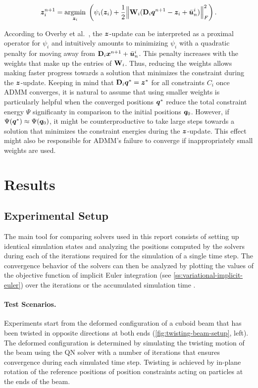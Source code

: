 \begin{equation}\label{eq:admm-z-update-copy}
    \bm{z}_i^{n+1} = \underset{\bm{z}_i}{\operatorname{argmin}}\; \left (\psi_i(\bm{z}_i) + \frac{1}{2}\norm{\mathbf{W}_i(\mathbf{D}_i\bm{q}^{n+1} - \bm{z}_i + \bar{\bm{u}}^i_n)}^2_F \right ).
\end{equation}

\noindent According to Overby et al.\ \cite{overby2017}, the $\bm{z}$-update can be interpreted as a proximal operator for $\psi_i$ and intuitively amounts to 
minimizing $\psi_i$ with a quadratic penalty for moving away from $\mathbf{D}_i\bm{x}^{n+1}+ \bar{\bm{u}}^i_n$. This penalty increases with the weights that make 
up the entries of $\mathbf{W}_i$. Thus, reducing the weights allows making faster progress towards a solution that minimizes the constraint during 
the $\bm{z}$-update. Keeping in mind that $\mathbf{D}_i\bm{q}^* = \bm{z}^*$ for all constraints $C_i$ once ADMM converges, it is natural to assume that using smaller
weights is particularly helpful when the converged positions $\bm{q}^*$ reduce the total constraint energy $\Psi$ significanty in comparison to the initial positions 
$\bm{q}_0$. However, if $\Psi(\bm{q}^*) \approx \Psi(\bm{q}_0)$, it might be counterproductive to take large steps towards a solution that minimizes the constraint 
energies during the $\bm{z}$-update. This effect might also be responsible for ADMM's failure to converge if inappropriately small weights are used.

\section{Results}

\subsection{Experimental Setup}
The main tool for comparing solvers used in this report consists of setting up identical simulation states and analyzing the positions 
computed by the solvers during each of the iterations required for the simulation of a single time step. The convergence behavior of the 
solvers can then be analyzed by plotting the values of the objective function of implicit Euler integration 
(see \cref{ss:variational-implicit-euler}) over the iterations or the accumulated simulation time \cite{liu2017, overby2017}.

\paragraph{Test Scenarios.}
Experiments start from the 
deformed configuration of a cuboid beam that has been twisted in opposite directions at both ends (\cref{fig:twisting-beam-setup}, left).
The deformed configuration is determined by simulating the twisting motion of the beam using the QN solver with a number of iterations 
that ensures convergence during each simulated time step. Twisting is achieved by in-plane rotation of the reference positions of 
position constraints acting on particles at the ends of the beam. 

